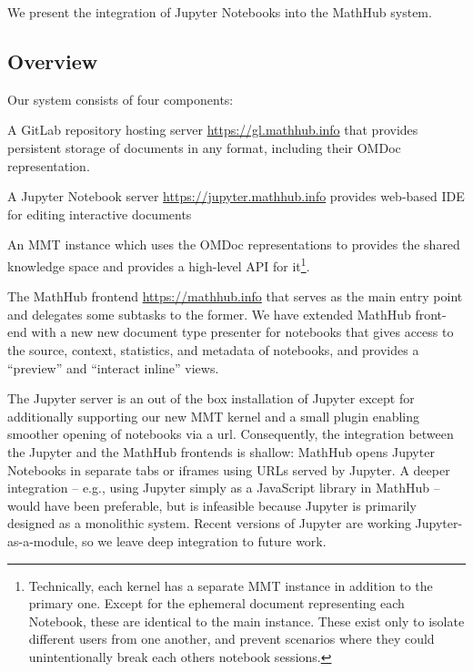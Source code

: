 We present the integration of Jupyter Notebooks into the MathHub system.

\subsection{Overview}

Our system consists of four components:
\begin{compactitem}
\item A GitLab repository hosting server \url{https://gl.mathhub.info} that provides persistent storage of documents in any format, including their OMDoc representation.
\item A Jupyter Notebook server \url{https://jupyter.mathhub.info} provides web-based IDE for editing interactive documents
\item An MMT instance which uses the OMDoc representations to provides the shared knowledge space and provides a high-level API for it\footnote{
    Technically, each kernel has a separate MMT instance in addition to the primary one. 
    Except for the ephemeral document representing each Notebook, these are identical to the main instance. 
    These exist only to isolate different users from one another, and prevent scenarios where they could unintentionally break each others notebook sessions.  
  }.
\item The MathHub frontend \url{https://mathhub.info} that serves as the main entry point and delegates some subtasks to the former.
  We have extended MathHub front-end with a new new document type presenter for notebooks that gives access to the source, context, statistics, and metadata of notebooks, and provides a ``preview'' and ``interact inline'' views.  
\end{compactitem}

The Jupyter server is an out of the box installation of Jupyter except for additionally supporting our new MMT kernel and a small plugin enabling smoother opening of notebooks via a url. 
Consequently, the integration between the Jupyter and the MathHub frontends is shallow: MathHub opens Jupyter Notebooks in separate tabs or iframes using URLs served by Jupyter.
A deeper integration -- e.g., using Jupyter simply as a JavaScript library in MathHub -- would have been preferable, but is infeasible because Jupyter is primarily designed as a monolithic system.
Recent versions of Jupyter are working Jupyter-as-a-module, so we leave deep integration to future work.


